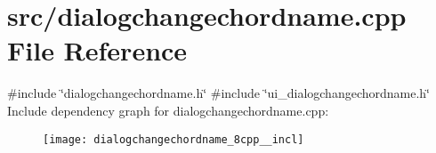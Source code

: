 \section{src/dialogchangechordname.cpp File Reference}
\label{dialogchangechordname_8cpp}
{\ttfamily \#include \char`\"{}dialogchangechordname.\+h\char`\"{}}\newline
{\ttfamily \#include \char`\"{}ui\+\_\+dialogchangechordname.\+h\char`\"{}}\newline
Include dependency graph for dialogchangechordname.\+cpp\+:\nopagebreak
\begin{figure}[H]
\begin{center}
\leavevmode
\texttt{[image: dialogchangechordname\_8cpp\_\_incl]}
\end{center}
\end{figure}
